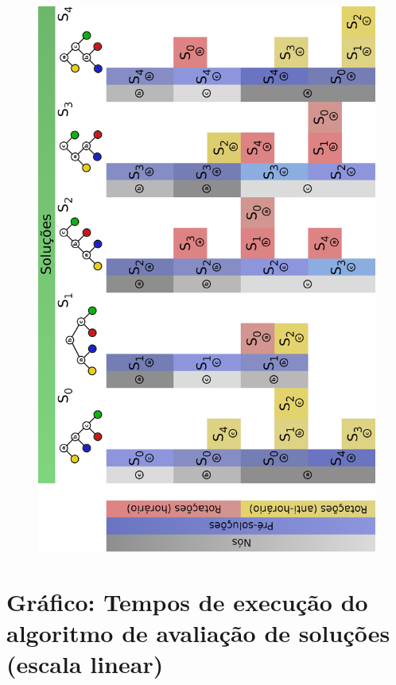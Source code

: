 \documentclass[
	12pt,				%
	openright,			%
	twoside,			%
	a4paper,			%
	english,			%
	french,				%
	spanish,			%
	brazil				%
	]{abntex2}
\begin{document}
\begin{anexosenv}
\begin{figure}[H]
	\begin{center}
	    \includegraphics[scale=0.86]{alg_exp.png}
	\end{center}
\end{figure}

\chapter{Gráfico: Tempos de execução do algoritmo de avaliação de soluções (escala linear)}


\end{anexosenv}
\end{document}
